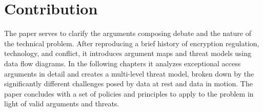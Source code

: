 \section{Contribution}

The paper serves to clarify the arguments composing debate and the nature of the technical problem. After reproducing a
brief history of encryption regulation, technology, and conflict, it introduces argument maps and threat models using
data flow diagrams. In the following chapters it analyzes exceptional access arguments in detail and creates a
multi-level threat model, broken down by the significantly different challenges posed by data at rest and data in
motion. The paper concludes with a set of policies and principles to apply to the problem in light of valid arguments
and threats.

